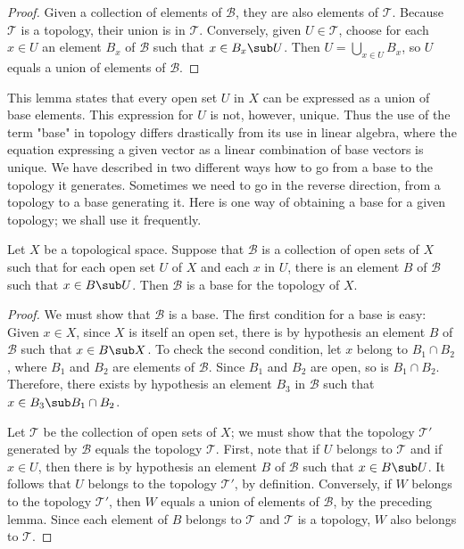 \begin{proof}
Given a collection of elements of $\mathcal{B}$, they are also elements of $\mathcal{T}$. Because $\mathcal{T}$ is a topology, their union is in $\mathcal{T}$. Conversely, given $U\in\mathcal{T}$, choose for each $x\in U$ an element $B_x$ of $\mathcal{B}$ such that $x\in B_x\sub U$. Then $U=\bigcup_{x\in U}B_x$, so $U$ equals a union of elements of $\mathcal{B}$.
\end{proof}
This lemma states that every open set $U$ in $X$ can be expressed as a union of base elements. This expression for $U$ is not, however, unique. Thus the use of the term "base" in topology differs drastically from its use in linear algebra, where the equation expressing a given vector as a linear combination of base vectors is unique. We have described in two different ways how to go from a base to the topology it generates.  Sometimes we need to go in the reverse direction, from a topology to a base generating it. Here is one way of obtaining a base for a given topology; we shall use it frequently.
\begin{proposition}\label{topo space base if}
Let $X$ be a topological space. Suppose that $\mathcal{B}$ is a collection of open sets of $X$ such that for each open set $U$ of $X$ and each $x$ in $U$, there is an element $B$ of $\mathcal{B}$ such that $x\in B\sub U$. Then $\mathcal{B}$ is a base for the topology of $X$.
\end{proposition}
\begin{proof}
We must show that $\mathcal{B}$ is a base. The first condition for a base is easy: Given $x\in X$, since $X$ is itself an open set, there is by hypothesis an element $B$ of $\mathcal{B}$ such that $x\in B\sub X$. To check the second condition, let $x$ belong to $B_1\cap B_2$, where $B_1$ and $B_2$ are elements of $\mathcal{B}$. Since $B_1$ and $B_2$ are open, so is $B_1\cap B_2$. Therefore, there exists by hypothesis an element $B_3$ in $\mathcal{B}$ such that $x\in B_3\sub B_1\cap B_2$.\par
Let $\mathcal{T}$ be the collection of open sets of $X$; we must show that the topology $\mathcal{T}'$ generated by $\mathcal{B}$ equals the topology $\mathcal{T}$. First, note that if $U$ belongs to $\mathcal{T}$ and if $x\in U$, then there is by hypothesis an element $B$ of $\mathcal{B}$ such that $x\in B\sub U$. It follows that $U$ belongs to the topology $\mathcal{T}'$, by definition. Conversely, if $W$ belongs to the topology $\mathcal{T}'$, then $W$ equals a union of elements of $\mathcal{B}$, by the preceding lemma. Since each element of $B$ belongs to $\mathcal{T}$ and $\mathcal{T}$ is a topology, $W$ also belongs to $\mathcal{T}$.
\end{proof}
